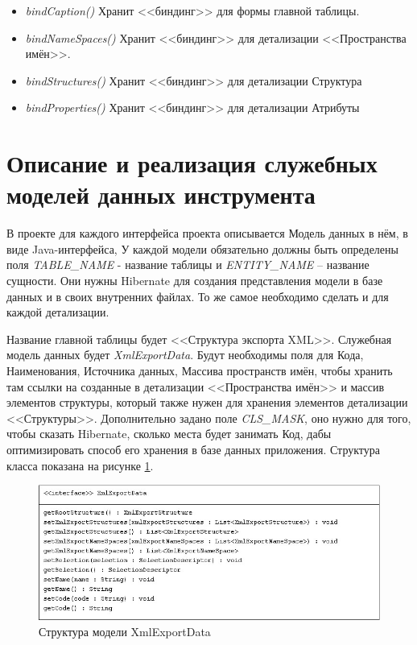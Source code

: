 \documentclass[a4paper,12pt]{diplom}
\begin{document}
\begin{itemize}
    \item \textit{bindCaption()} Хранит <<биндинг>> для формы главной таблицы.
    \item \textit{bindNameSpaces()} Хранит <<биндинг>> для детализации <<Пространства имён>>.
    \item \textit{bindStructures()} Хранит <<биндинг>> для детализации Структура
    \item \textit{bindProperties()} Хранит <<биндинг>> для детализации Атрибуты
\end{itemize}

\section{Описание и реализация служебных моделей данных инструмента}

В проекте для каждого интерфейса проекта описывается Модель данных в нём, в виде Java-интерфейса, У каждой модели обязательно должны быть определены поля \textit{TABLE\_NAME} - название таблицы и \textit{ENTITY\_NAME} -- название сущности. Они нужны Hibernate для создания представления модели в базе данных и в своих внутренних файлах. То же самое необходимо сделать и для каждой детализации.

Название главной таблицы будет <<Структура экспорта XML>>. Служебная модель данных будет \textit{XmlExportData}. Будут необходимы поля для Кода, Наименования, Источника данных, Массива пространств имён, чтобы хранить там ссылки на созданные в детализации <<Пространства имён>> и массив элементов структуры, который также нужен для хранения элементов детализации <<Структуры>>. Дополнительно задано поле \textit{CLS\_MASK}, оно нужно для того, чтобы сказать Hibernate, сколько места будет занимать Код, дабы оптимизировать способ его хранения в базе данных приложения. Структура класса показана на рисунке \ref{fig:maintable}.

\hfill

\begin{figure}[h!]
	\centering
	\includegraphics[width=\textwidth]{imgs/XmlExportData.jpg}
	\caption{Структура модели XmlExportData}
	\label{fig:maintable}
\end{figure}
\end{document}
